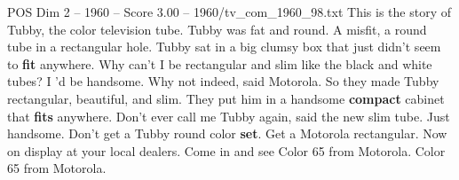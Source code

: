 \begin{textsample}{POS Dim 2 – 1960 – Score 3.00 – 1960/tv\_com\_1960\_98.txt}  \label{ex:f2_pos_024}
This is the story of Tubby, the color television tube.
Tubby was fat and round.
A misfit, a round tube in a rectangular hole.
Tubby sat in a big clumsy box that just didn't seem to \textbf{fit} anywhere.
Why can't I be rectangular and slim like the black and white tubes?
I 'd be handsome.
Why not indeed, said Motorola.
So they made Tubby rectangular, beautiful, and slim.
They put him in a handsome \textbf{compact} cabinet that \textbf{fits} anywhere.
Don't ever call me Tubby again, said the new slim tube.
Just handsome.
Don't get a Tubby round color \textbf{set}.
Get a Motorola rectangular.
Now on display at your local dealers.
Come in and see Color 65 from Motorola.
Color 65 from Motorola.

\end{textsample}
